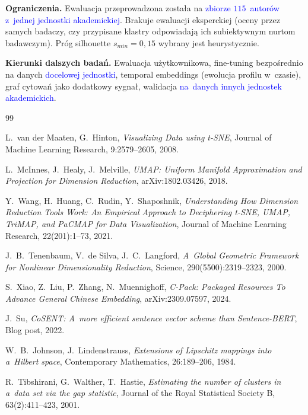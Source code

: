 \documentclass[a4paper,11pt,twocolumn]{article}
\newcommand{\hl}[1]{\textcolor{blue}{#1}}
\begin{document}
\textbf{Ograniczenia.} Ewaluacja przeprowadzona została na \hl{zbiorze
$115$~autorów z~jednej jednostki akademickiej}. Brakuje ewaluacji
eksperckiej (oceny przez samych badaczy, czy przypisane klastry
odpowiadają ich subiektywnym nurtom badawczym). Próg silhouette
$s_{min}=0{,}15$ wybrany jest heurystycznie.

\textbf{Kierunki dalszych badań.} Ewaluacja użytkownikowa, fine-tuning
bezpośrednio na danych \hl{docelowej jednostki}, temporal embeddings
(ewolucja profilu w~czasie), graf cytowań jako dodatkowy sygnał,
walidacja \hl{na~danych innych jednostek akademickich}.


\small
\begin{thebibliography}{99}

L.~van der Maaten, G.~Hinton,
\emph{Visualizing Data using t-SNE},
Journal of Machine Learning Research, 9:2579--2605, 2008.

L.~McInnes, J.~Healy, J.~Melville,
\emph{UMAP: Uniform Manifold Approximation and Projection
for Dimension Reduction},
arXiv:1802.03426, 2018.

Y.~Wang, H.~Huang, C.~Rudin, Y.~Shaposhnik,
\emph{Understanding How Dimension Reduction Tools Work:
An Empirical Approach to Deciphering t-SNE, UMAP, TriMAP,
and PaCMAP for Data Visualization},
Journal of Machine Learning Research, 22(201):1--73, 2021.

J.~B.~Tenenbaum, V.~de Silva, J.~C.~Langford,
\emph{A~Global Geometric Framework for Nonlinear
Dimensionality Reduction},
Science, 290(5500):2319--2323, 2000.

S.~Xiao, Z.~Liu, P.~Zhang, N.~Muennighoff,
\emph{C-Pack: Packaged Resources To Advance General
Chinese Embedding},
arXiv:2309.07597, 2024.

J.~Su,
\emph{CoSENT: A~more efficient sentence vector scheme
than Sentence-BERT},
Blog post, 2022.

W.~B.~Johnson, J.~Lindenstrauss,
\emph{Extensions of Lipschitz mappings into a~Hilbert space},
Contemporary Mathematics, 26:189--206, 1984.

R.~Tibshirani, G.~Walther, T.~Hastie,
\emph{Estimating the number of clusters in a~data set via
the gap statistic},
Journal of the Royal Statistical Society B, 63(2):411--423, 2001.


\end{thebibliography}
\end{document}
